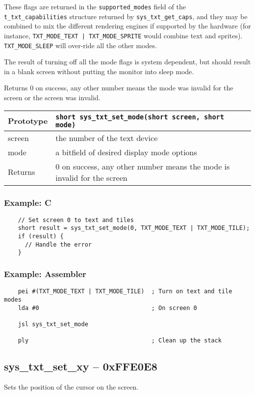 These flags are returned in the \verb+supported_modes+ field of the \verb+t_txt_capabilities+ structure returned by \verb+sys_txt_get_caps+, and they may be combined to mix the different rendering engines if supported by the hardware (for instance, \verb+TXT_MODE_TEXT | TXT_MODE_SPRITE+ would combine text and sprites). \verb+TXT_MODE_SLEEP+ will over-ride all the other modes.

The result of turning off all the mode flags is system dependent, but should result in a blank screen without putting the monitor into sleep mode.

Returns 0 on success, any other number means the mode was invalid for the screen or the screen was invalid.

\bigskip

\begin{tabular}{|l||l|} \hline
Prototype & \lstinline!short sys_txt_set_mode(short screen, short mode)! \\ \hline
screen & the number of the text device \\ \hline
mode & a bitfield of desired display mode options \\ \hline
Returns & 0 on success, any other number means the mode is invalid for the screen \\ \hline
\end{tabular}

\subsubsection*{Example: C}
\begin{lstlisting}
    // Set screen 0 to text and tiles
    short result = sys_txt_set_mode(0, TXT_MODE_TEXT | TXT_MODE_TILE);
    if (result) {
      // Handle the error
    }    
\end{lstlisting}

\subsubsection*{Example: Assembler}
\begin{verbatim}
    pei #(TXT_MODE_TEXT | TXT_MODE_TILE)  ; Turn on text and tile modes
    lda #0                                ; On screen 0
    
    jsl sys_txt_set_mode

    ply                                   ; Clean up the stack
\end{verbatim}


\subsection*{sys\_txt\_set\_xy -- 0xFFE0E8}
Sets the position of the cursor on the screen.

